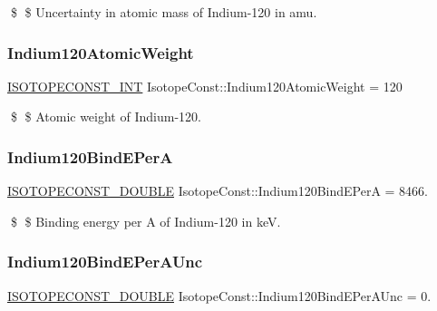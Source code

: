 \$ \$ Uncertainty in atomic mass of Indium-\/120 in amu. \mbox{\label{group___isotope_const-_indium-_in120_gaf2b3bfd22c128149f1e2092a1b6baa05}} 
\subsubsection{\texorpdfstring{Indium120\+Atomic\+Weight}{Indium120AtomicWeight}}
{\footnotesize\ttfamily \mbox{\hyperlink{group___isotope_const-_macros_ga5f18360b3e99483a35c32d789e62621c}{I\+S\+O\+T\+O\+P\+E\+C\+O\+N\+S\+T\+\_\+\+I\+NT}} Isotope\+Const\+::\+Indium120\+Atomic\+Weight = 120}

\$ \$ Atomic weight of Indium-\/120. \mbox{\label{group___isotope_const-_indium-_in120_gac27279ca3b378796f34f16db1df72b7c}} 
\subsubsection{\texorpdfstring{Indium120\+Bind\+E\+PerA}{Indium120BindEPerA}}
{\footnotesize\ttfamily \mbox{\hyperlink{group___isotope_const-_macros_ga8f45a7272ce02c0b4c65c44636ed719a}{I\+S\+O\+T\+O\+P\+E\+C\+O\+N\+S\+T\+\_\+\+D\+O\+U\+B\+LE}} Isotope\+Const\+::\+Indium120\+Bind\+E\+PerA = 8466.}

\$ \$ Binding energy per A of Indium-\/120 in keV. \mbox{\label{group___isotope_const-_indium-_in120_ga0cd284763babac43a26c5c9570955e54}} 
\subsubsection{\texorpdfstring{Indium120\+Bind\+E\+Per\+A\+Unc}{Indium120BindEPerAUnc}}
{\footnotesize\ttfamily \mbox{\hyperlink{group___isotope_const-_macros_ga8f45a7272ce02c0b4c65c44636ed719a}{I\+S\+O\+T\+O\+P\+E\+C\+O\+N\+S\+T\+\_\+\+D\+O\+U\+B\+LE}} Isotope\+Const\+::\+Indium120\+Bind\+E\+Per\+A\+Unc = 0.}

